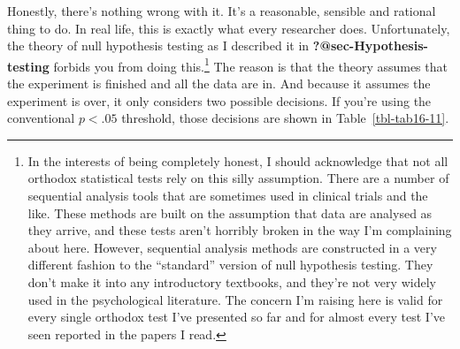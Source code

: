 \documentclass[
  a4paper,
]{book}
\begin{document}
Honestly, there's nothing wrong with it. It's a reasonable, sensible and
rational thing to do. In real life, this is exactly what every
researcher does. Unfortunately, the theory of null hypothesis testing as
I described it in \textbf{?@sec-Hypothesis-testing} forbids you from
doing this.\footnote{In the interests of being completely honest, I
  should acknowledge that not all orthodox statistical tests rely on
  this silly assumption. There are a number of sequential analysis tools
  that are sometimes used in clinical trials and the like. These methods
  are built on the assumption that data are analysed as they arrive, and
  these tests aren't horribly broken in the way I'm complaining about
  here. However, sequential analysis methods are constructed in a very
  different fashion to the ``standard'' version of null hypothesis
  testing. They don't make it into any introductory textbooks, and
  they're not very widely used in the psychological literature. The
  concern I'm raising here is valid for every single orthodox test I've
  presented so far and for almost every test I've seen reported in the
  papers I read.} The reason is that the theory assumes that the
experiment is finished and all the data are in. And because it assumes
the experiment is over, it only considers two possible decisions. If
you're using the conventional \(p < .05\) threshold, those decisions are
shown in Table~\ref{tbl-tab16-11}.

\hypertarget{tbl-tab16-11}{}
 
  \providecommand{\huxb}[2]{\arrayrulecolor[RGB]{#1}\global\arrayrulewidth=#2pt}
  \providecommand{\huxvb}[2]{\color[RGB]{#1}\vrule width #2pt}
  \providecommand{\huxtpad}[1]{\rule{0pt}{#1}}
  \providecommand{\huxbpad}[1]{\rule[-#1]{0pt}{#1}}
\end{document}
